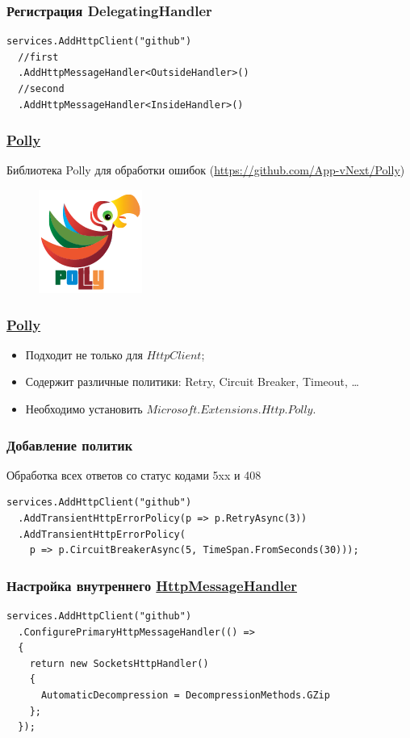 \documentclass[17pt,aspectratio=169]{beamer}
\begin{document}
\begin{frame}[fragile]
\frametitle{Регистрация DelegatingHandler}
\begin{lstlisting}
services.AddHttpClient("github")
  //first
  .AddHttpMessageHandler<OutsideHandler>()
  //second
  .AddHttpMessageHandler<InsideHandler>()
\end{lstlisting}
\end{frame}

\begin{frame}
\frametitle{\href{https://github.com/App-vNext/Polly}{Polly}}
Библиотека Polly для обработки ошибок (\href{https://github.com/App-vNext/Polly}{https://github.com/App-vNext/Polly})
\begin{figure}
\includegraphics[scale=0.4]{polly}
\end{figure}
\end{frame}

\begin{frame}
\frametitle{\href{https://github.com/App-vNext/Polly}{Polly}}
\begin{itemize}
	\item <1-> Подходит не только для $HttpClient$;
	\item <2-> Содержит различные политики: Retry, Circuit Breaker, Timeout, \ldots
	\item <3-> Необходимо установить \href{https://www.nuget.org/packages/Microsoft.Extensions.Http.Polly/}{$Microsoft.Extensions.Http.Polly$}.
\end{itemize}
\end{frame}

\begin{frame}[fragile]
\frametitle{Добавление политик}
Обработка всех ответов со статус кодами 5xx и 408
\newline
\begin{lstlisting}
services.AddHttpClient("github")
  .AddTransientHttpErrorPolicy(p => p.RetryAsync(3))
  .AddTransientHttpErrorPolicy(
    p => p.CircuitBreakerAsync(5, TimeSpan.FromSeconds(30)));
\end{lstlisting}
\end{frame}

\begin{frame}[fragile]
\frametitle{Настройка внутреннего \href{https://docs.microsoft.com/en-us/dotnet/api/system.net.http.socketshttphandler?view=netcore-2.2}{HttpMessageHandler}}
\begin{lstlisting}
services.AddHttpClient("github")
  .ConfigurePrimaryHttpMessageHandler(() =>
  {
    return new SocketsHttpHandler()
    {
      AutomaticDecompression = DecompressionMethods.GZip
    };
  });
\end{lstlisting}
\end{frame}
\end{document}
